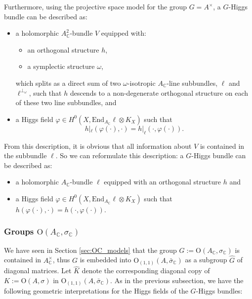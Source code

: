 \documentclass[oneside,11pt]{amsart}
\theoremstyle{definition}
\theoremstyle{remark}
\numberwithin{thm}{section}
\numberwithin{equation}{section}
\begin{document}
Furthermore, using the projective space model for the group $G=A^\times$, a $G$-Higgs bundle can be described as: 
\begin{itemize}
    \item a holomorphic $A^2_{\mathbb{C}}$-bundle $V$ equipped with:
    \begin{itemize}
    \item an orthogonal structure $h$,
    \item a symplectic structure $\omega$,
    \end{itemize}
    which splits as a direct sum of two $\omega$-isotropic $A_{\mathbb{C}}$-line subbundles, $\ell$ and $\ell^{\perp_{\omega}}$, such that $h$ descends to a non-degenerate orthogonal structure on each of these two line subbundles, and
    \item a Higgs field $\varphi\in H^0(X,\mathrm{End}_{A_\mathbb C}\ell\otimes K_X)$ such that 
    $$h|_{\ell}(\varphi(\cdot),\cdot)=h|_{\ell}(\cdot,\varphi(\cdot)).$$ 
\end{itemize}
From this description, it is obvious that all information about $V$ is contained in the subbundle $\ell$. So we can reformulate this description:
a $G$-Higgs bundle can be described as: 
\begin{itemize}
    \item a holomorphic $A_{\mathbb{C}}$-bundle $\ell$ equipped with an orthogonal structure $h$ and
    \item a Higgs field $\varphi\in H^0(X,\mathrm{End}_{A_\mathbb C}\ell\otimes K_X)$ such that $h(\varphi(\cdot),\cdot)=h(\cdot,\varphi(\cdot)).$ 
\end{itemize}

\subsubsection{Groups $\mathrm{O}(A_{\mathbb{C}}, \sigma_{\mathbb{C}})$}\label{subsec:O(A_C)defs}

We have seen in Section \ref{sec:OC_models} that the group $G:=\mathrm{O}(A_{\mathbb{C}},\sigma_{\mathbb{C}})$ is contained in $A_{\mathbb{C}}^{\times}$, thus $G$ is embedded into $\mathrm{O}_{(1,1)}(A,\bar{\sigma}_{\mathbb{C}})$ as a subgroup $\hat{G}$ of diagonal matrices. Let $\hat{K}$ denote the corresponding diagonal copy of $K:=\mathrm{O}(A, \sigma)$ in $\mathrm{O}_{(1,1)}(A,\bar{\sigma}_{\mathbb{C}})$. As in the previous subsection, we have the following geometric interpretations for the Higgs fields of the $G$-Higgs bundles: 
\end{document}
